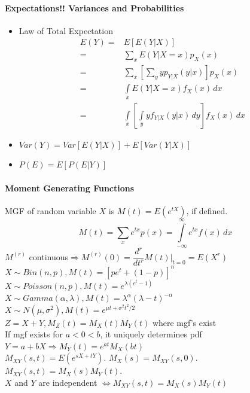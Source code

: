 \paragraph{Expectations!! Variances and Probabilities}
\begin{itemize}
  \item Law of Total Expectation
    \[\begin{aligned}E(Y)=&E[E(Y|X)]\\
    =&\sum\limits_{x}E(Y|X=x)p_{X}(x)\\
    =&\sum\limits_{x}\left[\sum\limits_{y}yp_{Y|X}(y|x)\right]p_{X}(x)\\
    =&\int\limits_{x}E(Y|X=x)f_{X}(x)\,dx\\
    =&\int\limits_{x}\left[\int\limits_{y}yf_{Y|X}(y|x)\,dy\right]f_{X}(x)\,dx
  \end{aligned}\]
  \item $Var(Y)=Var[E(Y|X)]+E[Var(Y|X)]$
  \item $P(E)=E[P(E|Y)]$
\end{itemize}
\paragraph{Moment Generating Functions}
MGF of random variable $X$ is $M(t)=E(e^{tX})$, if defined.
\[M(t)=\sum\limits_{x}e^{tx}p(x)=\int\limits_{-\infty}^{\infty}e^{tx}f(x)\,dx\]
$M^{(r)}$ continuous$\Rightarrow M^{(r)}(0)=\dfrac{d^r}{dt^r}M(t)\Big|_{t=0}=E(X^r)$\\
$X\sim Bin(n,p), M(t)={[pe^{t}+(1-p)]}^n$\\
$X\sim Poisson(n,p), M(t)=e^{\lambda(e^{t}-1)}$\\
$X\sim Gamma(\alpha,\lambda), M(t)=\lambda^{\alpha}{(\lambda-t)}^{-\alpha}$\\
$X\sim N(\mu,\sigma^2), M(t)=e^{\mu t+\sigma^{2}t^{2}/2}$\\
$Z=X+Y, M_{Z}(t)=M_{X}(t)M_{Y}(t)$ where mgf's exist\\
If mgf exists for $a<0<b$, it uniquely determines pdf\\
$Y=a+bX\Rightarrow M_{Y}(t)=e^{at}M_{X}(bt)$\\
$M_{XY}(s,t)=E(e^{sX+tY})$. $M_{X}(s)=M_{XY}(s,0)$. $M_{XY}(s,t)=M_{X}(s)M_{Y}(t)$.\\
$X$ and $Y$ are independent $\iff M_{XY}(s,t)=M_{X}(s)M_{Y}(t)$
